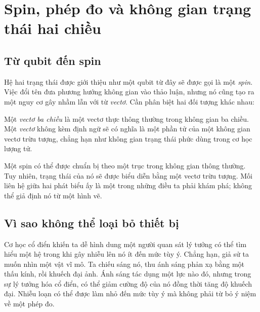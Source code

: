 \chapter{Spin, phép đo và không gian trạng thái hai chiều}


\section{Từ qubit đến spin}

Hệ hai trạng thái được giới thiệu như một qubit từ đây sẽ được gọi là một \emph{spin}. Việc đổi tên đưa phương hướng không gian vào thảo luận, nhưng nó cũng tạo ra một nguy cơ gây nhầm lẫn với từ \emph{vectơ}. Cần phân biệt hai đối tượng khác nhau:

\begin{definition}
Một \emph{vectơ ba chiều} là một vectơ thực thông thường trong không gian ba chiều. Một \emph{vectơ} không kèm định ngữ sẽ có nghĩa là một phần tử của một không gian vectơ trừu tượng, chẳng hạn như không gian trạng thái phức dùng trong cơ học lượng tử.
\end{definition}

Một spin có thể được chuẩn bị theo một trục trong không gian thông thường. Tuy nhiên, trạng thái của nó sẽ được biểu diễn bằng một vectơ trừu tượng. Mối liên hệ giữa hai phát biểu ấy là một trong những điều ta phải khám phá; không thể giả định nó từ một hình vẽ.

\section{Vì sao không thể loại bỏ thiết bị}

Cơ học cổ điển khiến ta dễ hình dung một người quan sát lý tưởng có thể tìm hiểu một hệ trong khi gây nhiễu lên nó ít đến mức tùy ý. Chẳng hạn, giả sử ta muốn nhìn một vật vĩ mô. Ta chiếu sáng nó, thu ánh sáng phản xạ bằng một thấu kính, rồi khuếch đại ảnh. Ánh sáng tác dụng một lực nào đó, nhưng trong sự lý tưởng hóa cổ điển, có thể giảm cường độ của nó đồng thời tăng độ khuếch đại. Nhiễu loạn có thể được làm nhỏ đến mức tùy ý mà không phải từ bỏ ý niệm về một phép đo.

